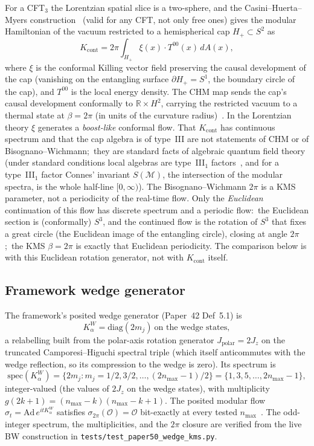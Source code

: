 \documentclass[11pt,a4paper]{article}
\theoremstyle{plain}
\theoremstyle{definition}
\newcommand{\nmax}{n_{\max}}
\newcommand{\sthree}{S^{3}}
\newcommand{\Op}{\mathcal{O}}
\newcommand{\R}{\mathbb{R}}
\newcommand{\Kalpha}{K_{\alpha}^{W}}
\begin{document}
For a CFT$_{3}$ the Lorentzian spatial slice is a two-sphere, and the
Casini--Huerta--Myers construction~\cite{casini_huerta_myers2011} (valid
for any CFT, not only free ones) gives the modular Hamiltonian of the
vacuum restricted to a hemispherical cap $H_{+} \subset S^{2}$ as
\begin{equation}
K_{\mathrm{cont}} = 2\pi \int_{H_{+}} \xi(x) \cdot T^{00}(x)\, dA(x),
\label{eq:K_chm}
\end{equation}
where $\xi$ is the conformal Killing vector field preserving the causal
development of the cap (vanishing on the entangling surface
$\partial H_{+} = S^{1}$, the boundary circle of the cap), and $T^{00}$
is the local energy density. The CHM map sends the cap's causal
development conformally to $\R \times H^{2}$, carrying the restricted
vacuum to a thermal state at $\beta = 2\pi$ (in units of the curvature
radius)~\cite{casini_huerta_myers2011, bisognano_wichmann1976}. In the
Lorentzian theory $\xi$ generates a \emph{boost-like} conformal flow.
That $K_{\mathrm{cont}}$ has continuous spectrum and that the cap
algebra is of type~III are not statements of CHM or of
Bisognano--Wichmann;\ they are standard facts of algebraic quantum field
theory (under standard conditions local algebras are type~III$_{1}$
factors~\cite{buchholz_dantoni_fredenhagen1987}, and for a type~III$_{1}$
factor Connes' invariant $S(\mathcal{M})$, the intersection of the
modular spectra, is the whole half-line $[0, \infty)$). The
Bisognano--Wichmann $2\pi$ is a KMS parameter, not a periodicity of the
real-time flow. Only the \emph{Euclidean} continuation of this flow has
discrete spectrum and a periodic flow:\ the Euclidean section is
(conformally) $\sthree$, and the continued flow is the rotation of
$\sthree$ that fixes a great circle (the Euclidean image of the
entangling circle), closing at angle $2\pi$;\ the KMS $\beta = 2\pi$ is
exactly that Euclidean periodicity. The comparison
below is with this Euclidean rotation generator, not with
$K_{\mathrm{cont}}$ itself.

\subsection{Framework wedge generator}

The framework's posited wedge generator (Paper~42 Def~5.1) is
\[
\Kalpha = \mathrm{diag}(2 m_j) \ \text{on the wedge states},
\]
a relabelling built from the polar-axis rotation generator
$J_{\mathrm{polar}} = 2J_z$ on the truncated Camporesi--Higuchi spectral
triple (which itself anticommutes with the wedge reflection, so its
compression to the wedge is zero). Its spectrum is
\[
\mathrm{spec}(\Kalpha) = \{2 m_{j} : m_{j} = 1/2, 3/2, \dots, (2\nmax - 1)/2\}
= \{1, 3, 5, \dots, 2\nmax - 1\},
\]
integer-valued (the values of $2J_{z}$ on the wedge states), with
multiplicity $g(2k + 1) = (\nmax - k)(\nmax - k + 1)$. The posited
modular flow $\sigma_{t} = \mathrm{Ad}\,e^{it\Kalpha}$ satisfies
$\sigma_{2\pi}(\Op) = \Op$
bit-exactly at every tested $\nmax$~\cite{paper42}. The odd-integer
spectrum, the multiplicities, and the $2\pi$ closure are verified
from the live BW construction in \texttt{tests/test\_paper50\_wedge\_kms.py}.
\end{document}
